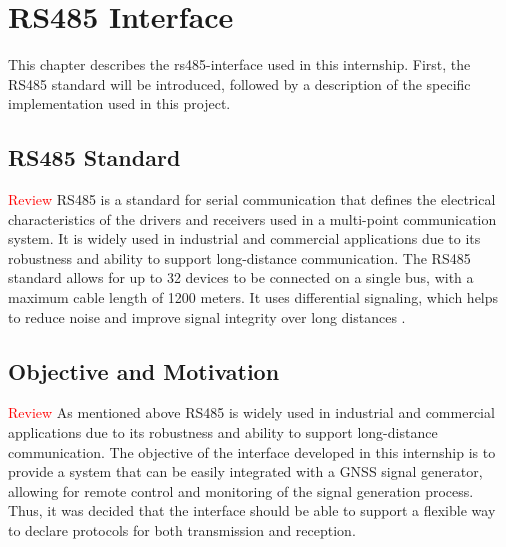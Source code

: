 %
\chapter{RS485 Interface}
\label{cha:rs485-interface}

This chapter describes the \gls{rs485-interface} used in this internship.
First, the \gls{RS485} standard will be introduced, followed by a description
of the specific implementation used in this project.

\section{RS485 Standard}
\textcolor{Red}{Review}
\gls{RS485} is a standard for serial communication that defines the electrical characteristics
of the drivers and receivers used in a multi-point communication system. It is widely used in
industrial and commercial applications due to its robustness and ability to support long-distance communication.
The \gls{RS485} standard allows for up to 32 devices to be connected on a single bus, with a maximum cable length
of 1200 meters. It uses differential signaling, which helps to reduce noise and improve signal integrity over long distances
\cite{wikipediaRS485}\cite{wang2026rs485}.

\section{Objective and Motivation}
\textcolor{Red}{Review}
As mentioned above \gls{RS485} is widely used in industrial and commercial
applications due to its robustness and ability to support long-distance
communication. The objective of the interface developed in this internship is
to provide a system that can be easily integrated with a \gls{GNSS} signal
generator, allowing for remote control and monitoring of the signal generation
process. Thus, it was decided that the interface should be able to support a
flexible way to declare protocols for both transmission and reception.

